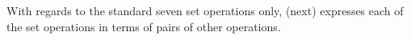 With regards to the standard seven set operations only,
 (next) expresses each of the set operations
in terms of pairs of other operations.
\begin{theorem}
\label{thm:ss_rel_gg}
\end{theorem}

